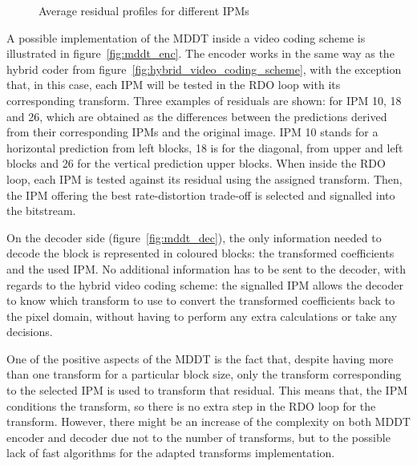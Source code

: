 \documentclass[11pt,a4paper,openright,twoside]{book}
\numberwithin{equation}{section} %
\numberwithin{figure}{section} %
\numberwithin{table}{section} %
\begin{document}
\begin{figure}[tb]
	\hfill
	\hfill
	\caption{Average residual profiles for different \acsp{IPM}}
	\label{fig:residual_differences}
\end{figure}

A possible implementation of the \ac{MDDT} inside a video coding scheme is
illustrated in figure~\ref{fig:mddt_enc}.
The encoder works in the same way as the hybrid coder from
figure~\ref{fig:hybrid_video_coding_scheme}, with the exception that, in this
case, each \ac{IPM} will be tested in the \ac{RDO} loop with its corresponding
transform.
Three examples of residuals are shown: for \ac{IPM} 10, 18 and 26, which are
obtained as the differences between the predictions derived from their
corresponding \acp{IPM} and the original image.
\ac{IPM} 10 stands for a horizontal prediction from left blocks, 18 is for the
diagonal, from upper and left blocks and 26 for the vertical prediction upper
blocks.
When inside the \ac{RDO} loop, each \ac{IPM} is tested against its residual
using the assigned transform.
Then, the \ac{IPM} offering the best rate-distortion trade-off is selected and
signalled into the bitstream.

On the decoder side (figure~\ref{fig:mddt_dec}), the only information needed
to decode the block is represented in coloured blocks:
the transformed coefficients and the used \ac{IPM}.
No additional information has to be sent to the decoder, with regards to the
hybrid video coding scheme:
the signalled \ac{IPM} allows the decoder to know which transform to use to
convert the transformed coefficients back to the pixel domain, without having
to perform any extra calculations or take any decisions.

One of the positive aspects of the \ac{MDDT} is the fact that, despite having
more than one transform for a particular block size, only the transform
corresponding to the selected \ac{IPM} is used to transform that residual.
This means that, the \ac{IPM} conditions the transform, so there is no extra
step in the \ac{RDO} loop for the transform.
However, there might be an increase of the complexity on both \ac{MDDT}
encoder and decoder due not to the number of transforms, but to the possible
lack of fast algorithms for the adapted transforms implementation.
\end{document}
